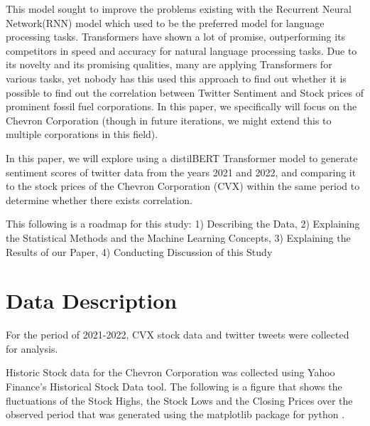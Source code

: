 \documentclass[12pt, letterpaper, titlepage]{article}
\begin{document}
This model sought to improve the problems existing with the Recurrent Neural Network(RNN) model which used to be the preferred model for language processing tasks. Transformers have shown a lot of promise, outperforming its competitors in speed and accuracy for natural language processing tasks. Due to its novelty and its promising qualities, many are applying Transformers for various tasks, yet nobody has this used this approach to find out whether it is possible to find out the correlation between Twitter Sentiment and Stock prices of prominent fossil fuel corporations. In this paper, we specifically will focus on the Chevron Corporation (though in future iterations, we might extend this to multiple corporations in this field).

In this paper, we will explore using a distilBERT Transformer model to generate sentiment scores of twitter data from the years 2021 and 2022, and comparing it to the stock prices of the Chevron Corporation (CVX) within the same period to determine whether there exists correlation. 

This following is a roadmap for this study: 1) Describing the Data, 2) Explaining the Statistical Methods and the Machine Learning Concepts, 3) Explaining the Results of our Paper, 4) Conducting Discussion of this Study

\label{sec: datadesc}
\section{Data Description}

For the period of 2021-2022,  CVX stock data and twitter tweets were collected for analysis.

Historic Stock data for the Chevron Corporation was collected using Yahoo Finance's Historical Stock Data tool. The following is a figure that shows the fluctuations of the Stock Highs, the Stock Lows and the Closing Prices over the observed period that was generated using the matplotlib package for python \citep{Hunter_2007}. 
\end{document}
